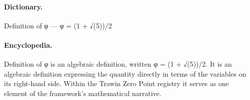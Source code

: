 \paragraph{Dictionary.}
Definition of φ — φ = (1 + √(5))/2

\paragraph{Encyclopedia.}
Definition of φ is an algebraic definition, written φ = (1 + √(5))/2. It is an algebraic definition expressing the quantity directly in terms of the variables on its right-hand side. Within the Trawin Zero Point registry it serves as one element of the framework's mathematical narrative.
